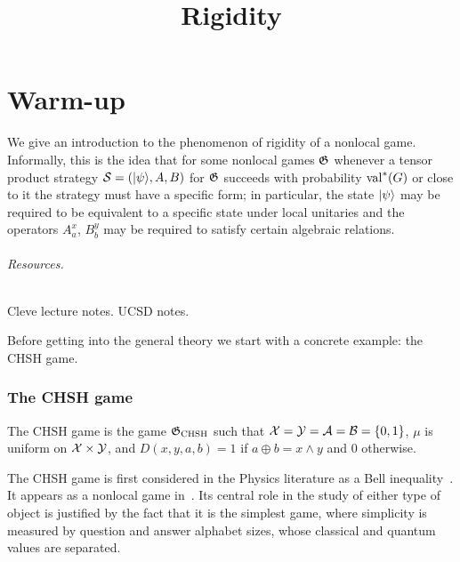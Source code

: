 



\part{Warm-up}
\label{book-part-warmup}

\title{Rigidity}
\label{rigidity}

\maketitle

\label{section-phantom}

\tableofcontents

We give an introduction to the phenomenon of rigidity of a nonlocal game. Informally, this is the idea that for some nonlocal games $\mathfrak{G}$ whenever a tensor product strategy $\mathcal{S} = (|\psi\rangle,A,B)$ for $\mathfrak{G}$ succeeds with probability $\mathrm{val}^*(G)$ or close to it the strategy must have a specific form; in particular, the state $|\psi\rangle$ may be required to be equivalent to a specific state under local unitaries and the operators $A^x_a$, $B^y_b$ may be required to satisfy certain algebraic relations. 

\paragraph{Resources.} Cleve lecture notes. UCSD notes. 

Before getting into the general theory we start with a concrete example: the CHSH game. 

\section{The CHSH game}
\label{section-chsh}

\begin{definition}
\label{definition-chsh}
The CHSH game is the game $\mathfrak{G}_{\mathrm{CHSH}}$ such that $\mathcal{X} = \mathcal{Y} = \mathcal{A} = \mathcal{B} = \{0,1\}$, $\mu$ is uniform on $\mathcal{X} \times \mathcal{Y}$, and $D(x,y,a,b) = 1$ if $a\oplus b = x\wedge y$ and $0$ otherwise. 
\end{definition}

The CHSH game is first considered in the Physics literature as a Bell inequality~\cite{clauser1969proposed}. It appears as a nonlocal game in~\cite{cleve2004consequences}. Its central role in the study of either type of object is justified by the fact that it is the simplest game, where simplicity is measured by question and answer alphabet sizes, whose classical and quantum values are separated. 

